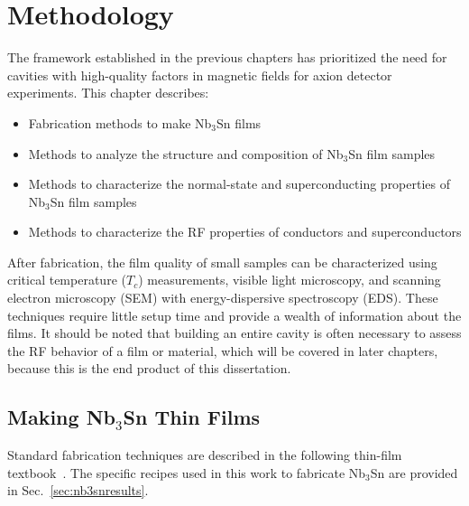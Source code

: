 \chapter{Methodology}\label{sec:chapter3}

The framework established in the previous chapters has prioritized the need for cavities with high-quality factors in magnetic fields for axion detector experiments. This chapter describes:

\begin{itemize}
    \item Fabrication methods to make Nb$_3$Sn films 
    \item Methods to analyze the structure and composition of Nb$_3$Sn film samples 
    \item Methods to characterize the normal-state and superconducting properties of Nb$_3$Sn film samples
    \item Methods to characterize the RF properties of conductors and superconductors
\end{itemize}

After fabrication, the film quality of small samples can be characterized using critical temperature ($T_c$) measurements, visible light microscopy, and scanning electron microscopy (SEM) with energy-dispersive spectroscopy (EDS). These techniques require little setup time and provide a wealth of information about the films.  It should be noted that building an entire cavity is often necessary to assess the RF behavior of a film or material, which will be covered in later chapters, because this is the end product of this dissertation.







\section{Making \texorpdfstring{Nb$_3$Sn}{Nb3Sn} Thin Films}

Standard fabrication techniques are described in the following thin-film textbook~\cite{seshanHandbookThinFilm2002}. The specific recipes used in this work to fabricate Nb$_3$Sn are provided in Sec.~\ref{sec:nb3snresults}.


